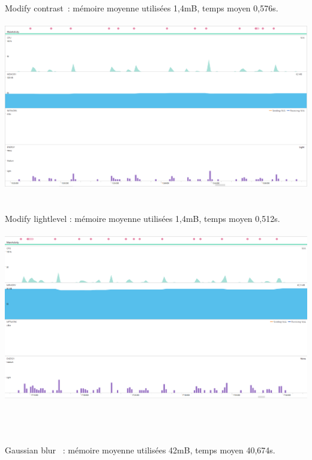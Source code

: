 \documentclass[12pt]{article}
\begin{document}
    Modify contrast : mémoire moyenne utilisées 1,4mB, temps moyen 0,576s.\\



\\

    \includegraphics{modifycontrast}
    \\

\\
\\



    Modify lightlevel : mémoire moyenne utilisées 1,4mB, temps moyen 0,512s.\\




\\

    \includegraphics{modifylight}



\\
\\
\\



    Gaussian blur  : mémoire moyenne utilisées 42mB, temps moyen 40,674s.\\
\end{document}
